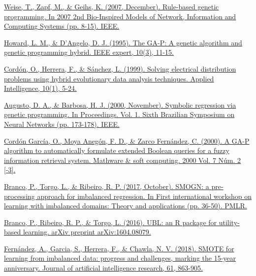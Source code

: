 \begin{thebibliography}{9}

	\href{https://ieeexplore.ieee.org/abstract/document/4610073}{Weise, T., Zapf, M., \& Geihs, K. (2007, December). Rule-based genetic programming. In 2007 2nd Bio-Inspired Models of Network, Information and Computing Systems (pp. 8-15). IEEE.}


	\href{https://ieeexplore.ieee.org/stamp/stamp.jsp?tp=&arnumber=393137}{Howard, L. M., \& D'Angelo, D. J. (1995). The GA-P: A genetic algorithm and genetic programming hybrid. IEEE expert, 10(3), 11-15.}


	\href{https://link.springer.com/article/10.1023/A:1008384630089}{Cordón, O., Herrera, F., \& Sánchez, L. (1999). Solving electrical distribution problems using hybrid evolutionary data analysis techniques. Applied Intelligence, 10(1), 5-24.}



	\href{https://ieeexplore.ieee.org/document/889734}{Augusto, D. A., \& Barbosa, H. J. (2000, November). Symbolic regression via genetic programming. In Proceedings. Vol. 1. Sixth Brazilian Symposium on Neural Networks (pp. 173-178). IEEE.}


	\href{https://upcommons.upc.edu/handle/2099/3586}{Cordón García, O., Moya Anegón, F. D., \& Zarco Fernández, C. (2000). A GA-P algorithm to automatically formulate extended Boolean queries for a fuzzy information retrieval system. Mathware \& soft computing. 2000 Vol. 7 Núm. 2 [-3].}


	\href{http://proceedings.mlr.press/v74/branco17a/branco17a.pdf}{Branco, P., Torgo, L., \& Ribeiro, R. P. (2017, October). SMOGN: a pre-processing approach for imbalanced regression. In First international workshop on learning with imbalanced domains: Theory and applications (pp. 36-50). PMLR.}


	\href{https://web.cs.dal.ca/~branco/PDFfiles/j3.pdf}{Branco, P., Ribeiro, R. P., \& Torgo, L. (2016). UBL: an R package for utility-based learning. arXiv preprint arXiv:1604.08079.}



	\href{https://www.jair.org/index.php/jair/article/view/11192}{Fernández, A., Garcia, S., Herrera, F., \& Chawla, N. V. (2018). SMOTE for learning from imbalanced data: progress and challenges, marking the 15-year anniversary. Journal of artificial intelligence research, 61, 863-905.}


\end{thebibliography}
